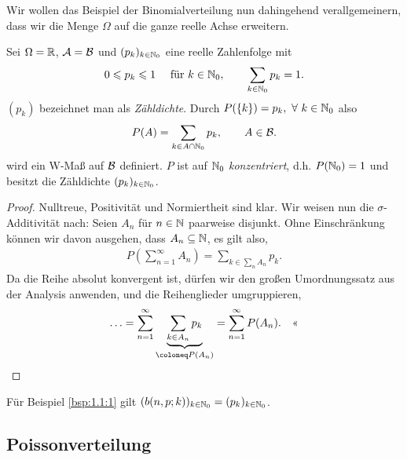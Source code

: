 Wir wollen das Beispiel der Binomialverteilung nun dahingehend verallgemeinern,
dass wir die Menge $\Omega$ auf die ganze reelle Achse erweitern.

\begin{defnn}
Sei $\Omega=\mathbb{R}$, $\mathcal{A} = \mathcal{B}$ und 
$(p_k)_{k\in\mathbb{N}_0}$ eine reelle Zahlenfolge mit
\begin{align*}
0\leqslant p_k \leqslant 1\quad \text{ für } k\in\mathbb{N}_0,\qquad \sum\limits_{k\in\mathbb{N}_0} p_k = 1.
\end{align*}
$(p_k)$ bezeichnet man als \emph{Zähldichte}. Durch $P(\setd{k}) = p_k, \forall
k\in\N_0$ also
\begin{align*}
P(A) = \sum\limits_{k\in A\cap \mathbb{N}_0} p_k,\qquad A\in\mathcal{B}.
\end{align*}
wird ein W-Maß auf $\mathcal{B}$ definiert.
$P$ ist auf $\mathbb{N}_0$ \emph{konzentriert}, d.h. $P(\mathbb{N}_0)=1$ und besitzt die
Zähldichte $(p_k)_{k\in\mathbb{N}_0}$.\fishhere
\end{defnn}
\begin{proof}
Nulltreue, Positivität und Normiertheit sind klar. Wir weisen nun die
$\sigma$-Additivität nach: Seien $A_n$ für $n\in\mathbb{N}$ paarweise disjunkt. Ohne
Einschränkung können wir davon ausgehen, dass $A_n\subseteq\mathbb{N}$, es gilt also,
\begin{align*}
P\left(\sum\limits_{n=1}^\infty A_n\right) = \sum\limits_{k\in \sum_n A_n} p_k.
\end{align*}
Da die Reihe absolut konvergent ist, dürfen wir den großen Umordnungssatz
aus der Analysis anwenden, und die Reihenglieder umgruppieren,
\begin{align*}
\ldots = \sum\limits_{n=1}^\infty \underbrace{\sum\limits_{k\in A_n} p_k}_{\defl
P(A_n)} = \sum_{n=1}^\infty P(A_n).\qedhere
\end{align*}
\end{proof}

Für Beispiel \ref{bsp:1.1:1} gilt $(b(n,p;k))_{k\in\mathbb{N}_0} = (p_k)_{k\in\mathbb{N}_0}$.

\subsection{Poissonverteilung}

